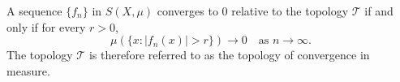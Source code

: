 A sequence $\{f_n\}$ in $S(X, \mu)$ converges to $0$ relative to the topology $\mathcal{T}$ if and only if for every $r > 0$,
$$
\mu(\{ x : |f_n(x)| > r \}) \to 0 \quad \text{as } n \to \infty.
$$
The topology $\mathcal{T}$ is therefore referred to as the topology of convergence in measure.
